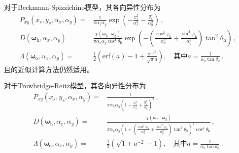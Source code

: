 对于Beckmann-Spizzichino模型，其各向异性分布为
\begin{align}
    P_{xy}(x_s,y_s,\alpha_x,\alpha_y)=&\frac{1}{\pi\alpha_x\alpha_y}\exp\left(-\frac{x_s^2}{\alpha_x^2}-\frac{y_s^2}{\alpha_y^2}\right)\, ,\\
    D({\bm\omega}_{\mathrm{h}},\alpha_x,\alpha_y)=&\frac{\chi({\bm\omega}_{\mathrm{h}}\cdot{\bm\omega}_{\mathrm{g}})}
    {\pi\alpha_x\alpha_y\cos^4\theta_{\mathrm{h}}}\exp\left(-\left(\frac{\cos^2\varphi_{\mathrm{h}}}{\alpha_x^2}
    +\frac{\sin^2\varphi_{\mathrm{h}}}{\alpha_y^2}\right)\tan^2\theta_{\mathrm{h}}\right)\, ,\\
    \Lambda({\bm\omega}_{\mathrm{o}},\alpha_x,\alpha_y)=&\frac{1}{2}\left(\mathrm{erf}(a)-1
    +\frac{\mathrm{e}^{-a^2}}{\sqrt{\pi}a}\right),
    \quad\text{其中}a=\displaystyle\frac{1}{\alpha_{\mathrm{o}}\tan\theta_{\mathrm{o}}}\, .
\end{align}
且的近似计算方法仍然适用。

对于Trowbridge-Reitz模型，其各向异性分布为
\begin{align}
    P_{xy}(x_s,y_s,\alpha_x,\alpha_y)=&\frac{1}{\displaystyle\pi\alpha_x\alpha_y\left(1
    +\frac{x_s^2}{\alpha_x^2}+\frac{y_s^2}{\alpha_y^2}\right)^2}\, ,\\
    D({\bm\omega}_{\mathrm{h}},\alpha_x,\alpha_y)=&\frac{\chi({\bm\omega}_{\mathrm{h}}\cdot{\bm\omega}_{\mathrm{g}})}
    {\displaystyle\pi\alpha_x\alpha_y\left(1+\left(\frac{\cos^2\varphi_{\mathrm{h}}}{\alpha_x^2}
    +\frac{\sin^2\varphi_{\mathrm{h}}}{\alpha_y^2}\right)\tan^2\theta_{\mathrm{h}}\right)^2\cos^4\theta_{\mathrm{h}}}\, ,\\
    \Lambda({\bm\omega}_{\mathrm{o}},\alpha_x,\alpha_y)=&\frac{1}{2}(\sqrt{1+a^{-2}}-1),
    \quad\text{其中}a=\displaystyle\frac{1}{\alpha_{\mathrm{o}}\tan\theta_{\mathrm{o}}}\, .
\end{align}

